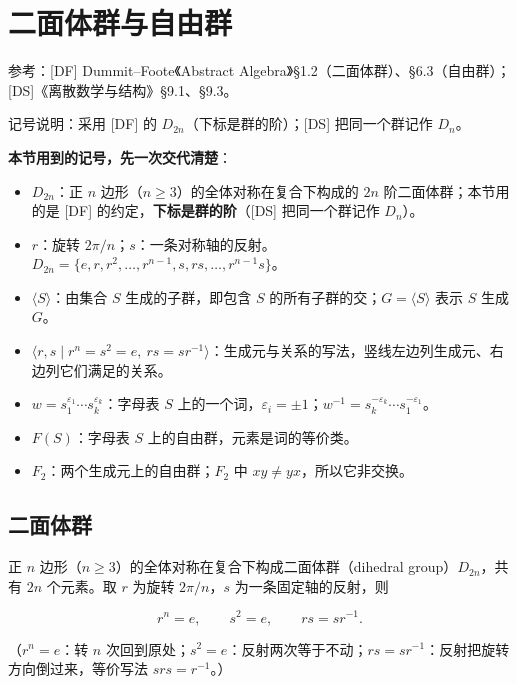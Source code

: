 \section{二面体群与自由群}


参考：[DF] Dummit–Foote《Abstract Algebra》§1.2（二面体群）、§6.3（自由群）；[DS]《离散数学与结构》§9.1、§9.3。

记号说明：采用 [DF] 的 $D_{2n}$（下标是群的阶）；[DS] 把同一个群记作 $D_n$。

\textbf{本节用到的记号，先一次交代清楚}：

\begin{itemize}
\item $D_{2n}$：正 $n$ 边形（$n\ge3$）的全体对称在复合下构成的 $2n$ 阶二面体群；本节用的是 [DF] 的约定，\textbf{下标是群的阶}（[DS] 把同一个群记作 $D_n$）。
\item $r$：旋转 $2\pi/n$；$s$：一条对称轴的反射。$D_{2n}=\{e,r,r^2,\dots,r^{n-1},s,rs,\dots,r^{n-1}s\}$。
\item $\langle S\rangle$：由集合 $S$ 生成的子群，即包含 $S$ 的所有子群的交；$G=\langle S\rangle$ 表示 $S$ 生成 $G$。
\item $\langle r,s\mid r^n=s^2=e,\ rs=sr^{-1}\rangle$：生成元与关系的写法，竖线左边列生成元、右边列它们满足的关系。
\item $w=s_1^{\varepsilon_1}\cdots s_k^{\varepsilon_k}$：字母表 $S$ 上的一个词，$\varepsilon_i=\pm1$；$w^{-1}=s_k^{-\varepsilon_k}\cdots s_1^{-\varepsilon_1}$。
\item $F(S)$：字母表 $S$ 上的自由群，元素是词的等价类。
\item $F_2$：两个生成元上的自由群；$F_2$ 中 $xy\ne yx$，所以它非交换。
\end{itemize}


\subsection{二面体群}


正 $n$ 边形（$n\ge3$）的全体对称在复合下构成二面体群（dihedral group）$D_{2n}$，共有 $2n$ 个元素。取 $r$ 为旋转 $2\pi/n$，$s$ 为一条固定轴的反射，则

\[r^n=e,\qquad s^2=e,\qquad rs=sr^{-1}.\]

（$r^n=e$：转 $n$ 次回到原处；$s^2=e$：反射两次等于不动；$rs=sr^{-1}$：反射把旋转方向倒过来，等价写法 $srs=r^{-1}$。）


